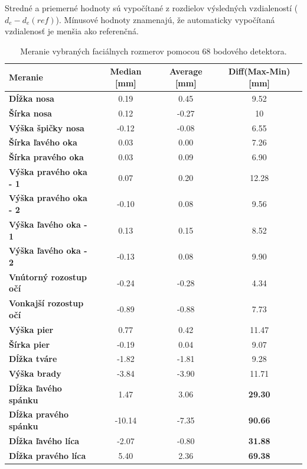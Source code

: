 Stredné a priemerné hodnoty sú vypočítané z rozdielov výsledných vzdialeností ($d_e-d_e(ref)$). Mínusové hodnoty znamenajú, že automaticky vypočítaná vzdialenosť je menšia ako referenčná.
 
\begin{table}[h]
	\caption{\label{tab:dlib:results} Meranie vybraných faciálnych rozmerov pomocou 68 bodového detektora.}
	\centering
	\begin{tabular}{lccc}
		\toprule
		\textbf{Meranie} & \textbf{Median [mm]} & \textbf{Average [mm]} & \textbf{Diff(Max-Min) [mm]} \\ 
		\midrule
		\textbf{Dĺžka nosa} 			& 0.19 	& 0.45 	& 9.52	\\
		\textbf{Šírka nosa} 			& 0.12	& -0.27 & 10	\\
		\textbf{Výška špičky nosa} 		& -0.12	& -0.08 & 6.55	\\
		\textbf{Šírka ľavého oka} 		& 0.03	& 0.00	& 7.26	\\
		\textbf{Šírka pravého oka} 		& 0.03 	& 0.09	& 6.90	\\
		\textbf{Výška pravého oka - 1} 	& 0.07	& 0.20	& 12.28	\\
		\textbf{Výška pravého oka - 2} 	& -0.10	& 0.08	& 9.56	\\
		\textbf{Výška ľavého oka - 1} 	& 0.13	& 0.15	& 8.52	\\
		\textbf{Výška ľavého oka - 2} 	& -0.13 & 0.08	& 9.90	\\
		\textbf{Vnútorný rozostup očí} 	& -0.24	& -0.28	& 4.34	\\
		\textbf{Vonkajší rozostup očí} 	& -0.89	& -0.88	& 7.73	\\
		\textbf{Výška pier} 			& 0.77	& 0.42	& 11.47	\\
		\textbf{Šírka pier} 			& -0.19 & 0.04	& 9.07	\\
		\textbf{Dĺžka tváre} 			& -1.82	& -1.81	& 9.28	\\
		\textbf{Výška brady} 			& -3.84	& -3.90	& 11.71	\\
		\textbf{Dĺžka ľavého spánku} 	& 1.47	& 3.06	& \textbf{29.30}	\\
		\textbf{Dĺžka pravého spánku} 	& -10.14& -7.35	& \textbf{90.66}	\\
		\textbf{Dĺžka ľavého líca} 		& -2.07	& -0.80	& \textbf{31.88}	\\
		\textbf{Dĺžka pravého líca} 	& 5.40	& 2.36	& \textbf{69.38}	\\
		\bottomrule
	\end{tabular}
\end{table}

